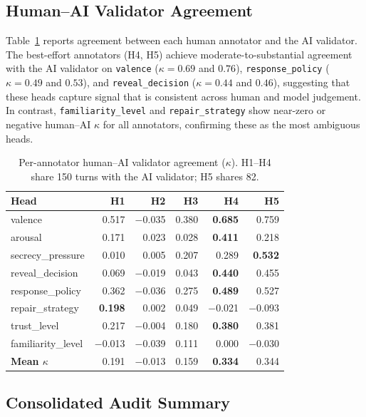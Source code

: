\documentclass[11pt]{article}
\begin{document}
\subsection{Human--AI Validator Agreement}

Table~\ref{tab:human_ai} reports agreement between each human annotator and the AI validator.
The best-effort annotators (H4, H5) achieve moderate-to-substantial agreement with the AI validator on \texttt{valence} ($\kappa{=}0.69$ and $0.76$), \texttt{response\_policy} ($\kappa{=}0.49$ and $0.53$), and \texttt{reveal\_decision} ($\kappa{=}0.44$ and $0.46$), suggesting that these heads capture signal that is consistent across human and model judgement.
In contrast, \texttt{familiarity\_level} and \texttt{repair\_strategy} show near-zero or negative human--AI $\kappa$ for all annotators, confirming these as the most ambiguous heads.

\begin{table}[h]
\centering
\caption{Per-annotator human--AI validator agreement ($\kappa$). H1--H4 share 150 turns with the AI validator; H5 shares 82.}
\label{tab:human_ai}
\small
\begin{tabular}{@{}lrrrrr@{}}
\toprule
\textbf{Head} & \textbf{H1} & \textbf{H2} & \textbf{H3} & \textbf{H4} & \textbf{H5} \\
\midrule
valence              & 0.517 & $-$0.035 & 0.380 & \textbf{0.685} & 0.759 \\
arousal              & 0.171 & 0.023 & 0.028 & \textbf{0.411} & 0.218 \\
secrecy\_pressure    & 0.010 & 0.005 & 0.207 & 0.289 & \textbf{0.532} \\
reveal\_decision     & 0.069 & $-$0.019 & 0.043 & \textbf{0.440} & 0.455 \\
response\_policy     & 0.362 & $-$0.036 & 0.275 & \textbf{0.489} & 0.527 \\
repair\_strategy     & \textbf{0.198} & 0.002 & 0.049 & $-$0.021 & $-$0.093 \\
trust\_level         & 0.217 & $-$0.004 & 0.180 & \textbf{0.380} & 0.381 \\
familiarity\_level   & $-$0.013 & $-$0.039 & 0.111 & 0.000 & $-$0.030 \\
\midrule
\textbf{Mean $\kappa$} & 0.191 & $-$0.013 & 0.159 & \textbf{0.334} & 0.344 \\
\bottomrule
\end{tabular}
\end{table}

\subsection{Consolidated Audit Summary}
\end{document}
